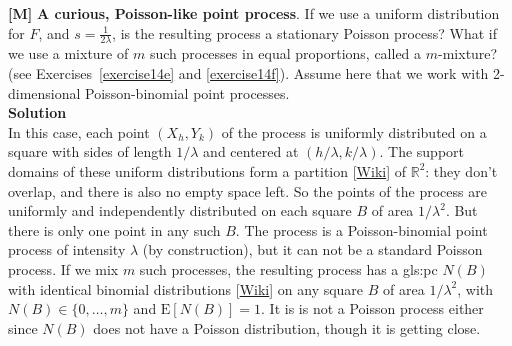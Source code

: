 \documentclass[10pt]{article}
\begin{document}
\begin{Exercise}\label{exerciseb1}
{\bf [M]}  {\bf A curious, Poisson-like point process}. If we use a uniform distribution for $F$, and $s=\frac{1}{2\lambda}$, is the resulting process a stationary Poisson process? What if we use a \textcolor{index}{mixture} of $m$ such processes in equal proportions, called a \textcolor{index}{$m$-mixture}? (see Exercises~\ref{exercise14e} and \ref{exercise14f}). Assume here that we work with 2-dimensional Poisson-binomial point processes.
 \vspace{1ex} \\
{\bf Solution} \vspace{1ex} \\
In this case, each point  $(X_h,Y_k)$ of the process is uniformly distributed on a square with sides of length $1/\lambda$ and centered at $(h/\lambda,k/\lambda)$.
The support domains of these uniform distributions form a
\textcolor{index}{partition} [\href{https://en.wikipedia.org/wiki/Partition_of_a_set}{Wiki}] of $\mathbb{R}^2$: they don't overlap, and there is also no empty space left. So the points of the process are uniformly and independently
distributed on each square $B$ of area $1/\lambda^2$. But there is only one point in any such $B$.
The process is a Poisson-binomial point process of intensity $\lambda$ (by construction), but it can not be a standard Poisson process.  If we mix $m$ such
processes, the resulting process has a \gls{gls:pc} $N(B)$ with identical \textcolor{index}{binomial distributions}
[\href{https://en.wikipedia.org/wiki/Binomial_distribution}{Wiki}] on any square $B$ of area $1/\lambda^2$,
 with $N(B)\in\{0,\dots,m\}$ and $\mbox{E}[N(B)]=1$.  It is is not a Poisson process either since $N(B)$ does not have a Poisson distribution, though it is getting close.
\end{Exercise}
\end{document}
